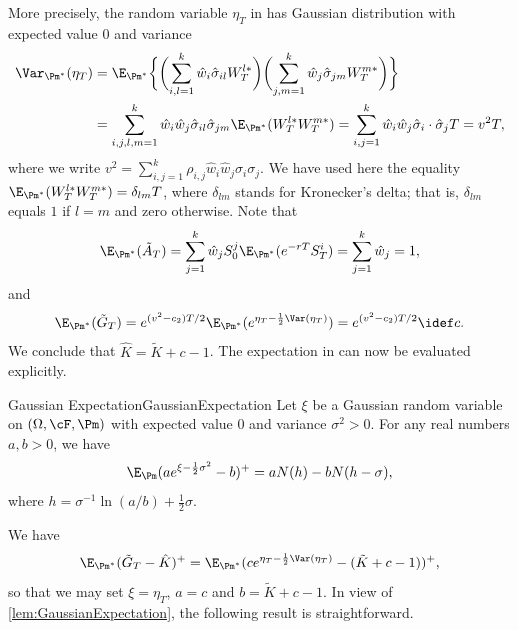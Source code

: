 More precisely, the random variable $\eta_T$ in  has Gaussian distribution with expected value $0$ and variance
\begin{align*}
	\Var_{\Pm^*} (\eta_T) & = \E_{\Pm^*} \biggl\{ \biggl( \sum_{i,l=1}^k \hat{w}_i \hat{\sigma}_{il} W_T^{l*} \biggr) \biggl( \sum_{j,m=1}^k \hat{w}_j \hat{\sigma}_{jm} W_T^{m*} \biggr) \biggr\}                          \\
	                      & = \sum_{i,j,l,m=1}^k \hat{w}_i \hat{w}_j \hat{\sigma}_{il} \hat{\sigma}_{jm} \E_{\Pm^*} (W_T^{l*} W_T^{m*}) = \sum_{i,j=1}^k \hat{w}_i \hat{w}_j \hat{\sigma}_i \cdot \hat{\sigma}_j T = v^2 T,
\end{align*}
where we write $v^2 = \sum_{i,j=1}^k \rho_{i,j} \hat{w}_i \hat{w}_j \sigma_i \sigma_j$. We have used here the equality $\E_{\Pm^*} (W_T^{l*} W_T^{m*}) = \delta_{lm} T$, where $\delta_{lm}$ stands for Kronecker's delta; that is, $\delta_{lm}$ equals $1$ if $l = m$ and zero otherwise. Note that
\[
	\E_{\Pm^*} (\tilde{A}_T) = \sum_{j=1}^k \hat{w}_j S_0^j \E_{\Pm^*} (e^{-rT} S_T^i) = \sum_{j=1}^k \hat{w}_j = 1,
\]
and
\[
	\E_{\Pm^*} (\tilde{G}_T) = e^{(v^2 - c_2) T / 2} \E_{\Pm^*} (e^{\eta_T - \frac{1}{2} \Var(\eta_T)}) = e^{(v^2 - c_2) T / 2} \idef c.
\]
We conclude that $\hat{K} = \tilde{K} + c - 1$. The expectation in  can now be evaluated explicitly.

\begin{lem}{Gaussian Expectation}{GaussianExpectation}
	Let $\xi$ be a Gaussian random variable on $(\Omega, \cF, \Pm)$ with expected value $0$ and variance $\sigma^2 > 0$. For any real numbers $a, b > 0$, we have
	\begin{equation} \label{eq:GaussianExpectationFormula}
		\E_{\Pm} (a e^{\xi - \frac{1}{2} \sigma^2} - b)^+ = a N(h) - b N(h - \sigma),
	\end{equation}
	where $h = \sigma^{-1} \ln(a/b) + \frac{1}{2} \sigma$.
\end{lem}

We have
\[
	\E_{\Pm^*} (\tilde{G}_T - \hat{K})^+ = \E_{\Pm^*} (c e^{\eta_T - \frac{1}{2} \Var(\eta_T)} - (\tilde{K} + c - 1))^+,
\]
so that we may set $\xi = \eta_T$, $a = c$ and $b = \tilde{K} + c - 1$. In view of \cref{lem:GaussianExpectation}, the following result is straightforward.


